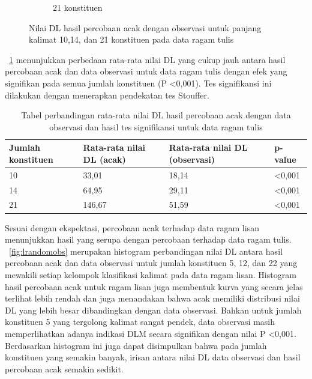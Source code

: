 \begin{figure}
\begin{subfigure}{.45\textwidth}
  \caption{21 konstituen}
  \label{fig:t21randomobs} 
\end{subfigure}

\caption{Nilai DL hasil percobaan acak dengan observasi untuk panjang kalimat 10,14, dan 21 konstituen pada data ragam tulis}
\label{fig:trandomobs}
\end{figure}


\tab~\ref{tab:perbandingan_DL_tulis} menunjukkan perbedaan rata-rata nilai DL yang cukup jauh antara hasil percobaan acak dan data observasi untuk data ragam tulis dengan efek yang signifikan pada semua jumlah konstituen (P \textless 0,001). Tes signifikansi ini dilakukan dengan menerapkan pendekatan tes Stouffer.

\begin{table}
\begin{center}
\begin{small}
  \caption{Tabel perbandingan rata-rata nilai DL hasil percobaan acak dengan data observasi dan hasil tes signifikansi untuk data ragam tulis}  \label{tab:perbandingan_DL_tulis}
  \begin{tabular}{ | l | l | l | l |}
    \hline
    	Jumlah konstituen & Rata-rata nilai DL (acak) & Rata-rata nilai DL (observasi) & p-value \\ \hline
	10 & 33,01 & 18,14 & \textless 0,001 \\ \hline
	14 & 64,95 & 29,11 & \textless 0,001 \\ \hline
	21 & 146,67 & 51,59 & \textless 0,001 \\ \hline
  \end{tabular}
  \end{small}
\end{center}
\end{table}

Sesuai dengan ekspektasi, percobaan acak terhadap data ragam lisan menunjukkan hasil yang serupa dengan percobaan terhadap data ragam tulis. \pic~\ref{fig:lrandomobs} merupakan histogram perbandingan nilai DL antara hasil percobaan acak dan data observasi untuk jumlah konstituen 5, 12, dan 22 yang mewakili setiap kelompok klasifikasi kalimat pada data ragam lisan. Histogram hasil percobaan acak untuk ragam lisan juga membentuk kurva yang secara jelas terlihat lebih rendah dan juga menandakan bahwa  acak memiliki distribusi nilai DL yang lebih besar dibandingkan dengan data observasi. Bahkan untuk jumlah konstituen 5 yang tergolong kalimat sangat pendek, data observasi masih memperlihatkan adanya indikasi DLM secara signifikan dengan nilai P \textless 0,001. Berdasarkan histogram ini juga dapat disimpulkan bahwa pada jumlah konstituen yang semakin banyak, irisan antara nilai DL data observasi dan hasil percobaan acak semakin sedikit.

